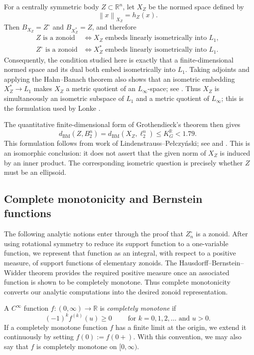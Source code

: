 \documentclass[11pt]{article}
\theoremstyle{definition}
\theoremstyle{remark}
\newcommand{\R}{\mathbb R}
\newcommand{\norm}[1]{\left\|#1\right\|}
\newcommand{\BM}{\mathrm{BM}}
\begin{document}
For a centrally symmetric body $Z\subset\R^n$, let $X_Z$ be the
normed space defined by
\[
 \norm{x}_{X_Z}=h_Z(x).
\]
Then $B_{X_Z}=Z^\circ$ and $B_{X_Z^*}=Z$, and therefore
\[
 \begin{split}
 Z\text{ is a zonoid}
 &\Longleftrightarrow X_Z\text{ embeds linearly isometrically into }L_1,\\
 Z^\circ\text{ is a zonoid}
 &\Longleftrightarrow X_Z^*\text{ embeds linearly isometrically into }L_1.
 \end{split}
\]
Consequently, the condition studied here is exactly that a
finite-dimensional normed space and its dual both embed isometrically
into $L_1$.  Taking adjoints and applying the Hahn--Banach theorem also
shows that an isometric embedding $X_Z^*\to L_1$ makes $X_Z$ a metric
quotient of an $L_\infty$-space; see
\cite[Theorem~3.3 and Chapter~4]{Rudin1991}.  Thus $X_Z$ is simultaneously an
isometric subspace of $L_1$ and a metric quotient of $L_\infty$; this
is the formulation used by Lonke \cite[p.~1]{Lonke1997}.

The quantitative finite-dimensional form of Grothendieck's theorem
then gives
\[
 d_{\BM}(Z,B_2^n)=d_{\BM}(X_Z,\ell_2^n)
 \leq K_G^{\R}<1.79.
\]
This formulation follows from work of
Lindenstrauss--Pe{\l}czy\'nski; see
\cite{Grothendieck1953,LindenstraussPelczynski1968} and
\cite[Corollary~2.7]{Pisier2012}.  This is an isomorphic conclusion:
it does not assert that the given norm of $X_Z$ is induced by an inner
product.  The corresponding isometric question is precisely whether
$Z$ must be an ellipsoid.

\subsection{Complete monotonicity and Bernstein functions}\label{compmonotone}
The following analytic notions enter through the proof that
$Z_n^\circ$ is a zonoid.  After using rotational symmetry to reduce
its support function to a one-variable function, we represent that
function as an integral, with respect to a positive measure, of
support functions of elementary zonoids.  The
Hausdorff--Bernstein--Widder theorem provides the required positive
measure once an associated function is shown to be completely
monotone.  Thus complete monotonicity converts our analytic
computations into the desired zonoid representation.


A $C^\infty$ function $f:(0,\infty)\to\R$ is \emph{completely monotone} if
\[
 (-1)^k f^{(k)}(u)\geq0
 \qquad \mbox{ for } k=0,1,2,\ldots \mbox{ and } u>0.
\]
If a completely monotone function $f$ has a finite limit at the
origin, we extend it continuously by setting
$
 f(0):=f(0+).
$
With this convention, we may also say that $f$ is completely monotone
on $[0,\infty)$.
\end{document}
